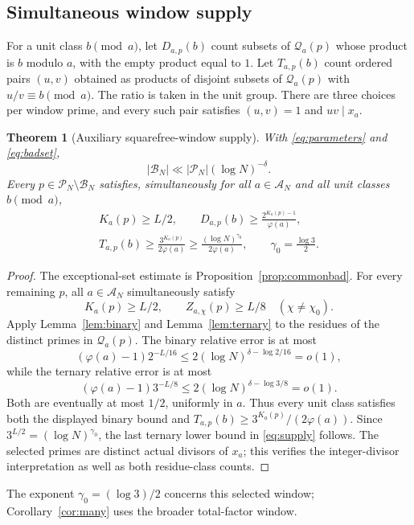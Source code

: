 \documentclass[11pt]{article}
\newtheorem{theorem}{Theorem}[section]
\theoremstyle{remark}\newtheorem{remark}[theorem]{Remark}
\newcommand{\cP}{\mathcal P}
\newcommand{\cA}{\mathcal A}
\newcommand{\cQ}{\mathcal Q}
\newcommand{\cB}{\mathcal B}
\begin{document}
\subsection{Simultaneous window supply}
For a unit class $b\pmod a$, let $D_{a,p}(b)$ count subsets of
$\cQ_a(p)$ whose product is $b$ modulo $a$, with the empty product equal
to $1$. Let $T_{a,p}(b)$ count ordered pairs $(u,v)$ obtained as products
of disjoint subsets of $\cQ_a(p)$ with $u/v\equiv b\pmod a$.
The ratio is taken in the unit group. There are three choices per
window prime, and every such pair satisfies $(u,v)=1$ and $uv\mid x_a$.

\begin{theorem}[Auxiliary squarefree-window supply]\label{thm:supply}
With \eqref{eq:parameters} and \eqref{eq:badset},
\[
 |\cB_N|\ll|\cP_N|(\log N)^{-\delta}.
\]
Every $p\in\cP_N\setminus\cB_N$ satisfies, simultaneously for all
$a\in\cA_N$ and all unit classes $b\pmod a$,
\begin{equation}\label{eq:supply}
\begin{gathered}
 K_a(p)\ge L/2,\qquad
 D_{a,p}(b)\ge\frac{2^{K_a(p)-1}}{\varphi(a)},\\
 T_{a,p}(b)\ge\frac{3^{K_a(p)}}{2\varphi(a)}
 \ge\frac{(\log N)^{\gamma_0}}{2\varphi(a)},
 \qquad \gamma_0=\frac{\log3}{2}.
\end{gathered}
\end{equation}
\end{theorem}
\begin{proof}
The exceptional-set estimate is Proposition~\ref{prop:commonbad}.
For every remaining $p$, all $a\in\cA_N$ simultaneously satisfy
\[
 K_a(p)\ge L/2,\qquad
 Z_{a,\chi}(p)\ge L/8\quad(\chi\ne\chi_0).
\]
Apply Lemma~\ref{lem:binary} and Lemma~\ref{lem:ternary} to the residues
of the distinct primes in $\cQ_a(p)$. The binary relative error is at most
\[
 (\varphi(a)-1)2^{-L/16}
 \le2(\log N)^{\delta-\log2/16}=o(1),
\]
while the ternary relative error is at most
\[
 (\varphi(a)-1)3^{-L/8}
 \le2(\log N)^{\delta-\log3/8}=o(1).
\]
Both are eventually at most $1/2$, uniformly in $a$. Thus every unit class
satisfies both the displayed binary bound and
$T_{a,p}(b)\ge3^{K_a(p)}/(2\varphi(a))$. Since
$3^{L/2}=(\log N)^{\gamma_0}$, the last ternary lower bound in
\eqref{eq:supply} follows. The selected primes are distinct actual divisors
of $x_a$; this verifies the integer-divisor interpretation as well as both
residue-class counts.
\end{proof}

The exponent $\gamma_0=(\log3)/2$ concerns this selected window;
Corollary~\ref{cor:many} uses the broader total-factor window.
\end{document}
